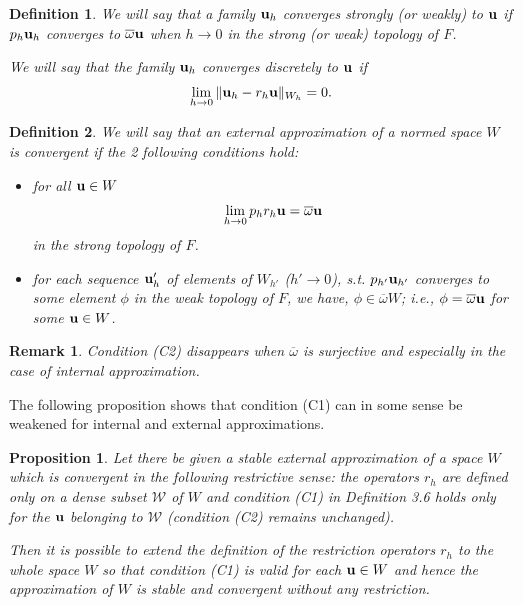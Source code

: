 \documentclass[oneside,11pt]{book}
\numberwithin{equation}{section}
\newtheorem{definition}{Definition}[section]
\newtheorem{proposition}{Proposition}[section]
\newtheorem{remark}{Remark}[section]
\begin{document}
\begin{definition}
    We will say that a family ${\bf u}_h$ \emph{converges strongly} (or \emph{weakly}) to ${\bf u}$ if $p_h{\bf u}_h$ converges to $\overline{\omega}{\bf u}$ when $h\to 0$ in the strong (or weak) topology of $F$.
    
    We will say that the family ${\bf u}_h$ \emph{converges discretely} to ${\bf u}$ if
    \begin{align*}
        \lim_{h\to 0} \|{\bf u}_h - r_h{\bf u}\|_{W_h} = 0.
    \end{align*}
\end{definition}

\begin{definition}
    We will say that an external approximation of a normed space $W$ is \emph{convergent} if the 2 following conditions hold:
    \begin{itemize}
        \item[(C1)] for all ${\bf u}\in W$
        \begin{align*}
            \lim_{h\to 0} p_hr_h{\bf u} = \overline{\omega}{\bf u}
        \end{align*}
        in the strong topology of $F$.
        \item[(C2)] for each sequence ${\bf u}_h'$ of elements of $W_{h'}$ ($h'\to 0$), s.t. $p_{h'}{\bf u}_{h'}$ converges to some element $\phi$ in the weak topology of $F$, we have, $\phi\in\overline{\omega}W$; i.e., $\phi = \overline{\omega}{\bf u}$ for some ${\bf u}\in W$.
    \end{itemize}
\end{definition}

\begin{remark}
    Condition (C2) disappears when $\overline{\omega}$ is surjective and especially in the case of internal approximation.
\end{remark}
The following proposition shows that condition (C1) can in some sense be weakened for internal and external approximations.

\begin{proposition}
    Let there be given a stable external approximation of a space $W$ which is convergent in the following restrictive sense: the operators $r_h$ are defined only on a dense subset $\mathcal{W}$ of $W$ and condition (C1) in Definition 3.6 holds only for the ${\bf u}$ belonging to $\mathcal{W}$ (condition (C2) remains unchanged).
    
    Then it is possible to extend the definition of the restriction operators $r_h$ to the whole space $W$ so that condition (C1) is valid for each ${\bf u}\in W$ and hence the approximation of $W$ is stable and convergent without any restriction.
\end{proposition}
\end{document}
